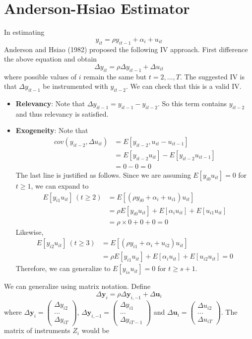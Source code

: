 \section{Anderson-Hsiao Estimator}
In estimating 
\[
y_{it}=\rho y_{it-1}+\alpha_i +u_{it}
\]
Anderson and Hsiao (1982) proposed the following IV approach. First difference the above equation and obtain
\[
\Delta y_{it}=\rho\Delta  y_{it-1} +\Delta u_{it}
\]
where possible values of $i$ remain the same but $t=2,...,T$. The suggested IV is that $\Delta y_{it-1}$ be instrumented with $y_{it-2}$. We can check that this is a valid IV. 
\begin{itemize}
\item \textbf{Relevancy}: Note that $\Delta y_{it-1}= y_{it-1}-y_{it-2}$. So this term contains $y_{it-2}$ and thus relevancy is satisfied.
\item \textbf{Exogeneity}: Note that
\begin{align*}
cov(y_{it-2},\Delta u_{it})&=E[y_{it-2}, u_{it}-u_{it-1}]\\
&=E[y_{it-2}u_{it}]-E[y_{it-2}u_{it-1}]\\
&=0-0=0
\end{align*}
The last line is justified as follows. Since we are assuming $E[y_{i0}u_{it}]=0$ for $t\geq1$, we can expand to
\begin{align*}
E[y_{i1}u_{it}]\ (t\geq 2)&=E[(\rho y_{i0}+\alpha_i +u_{i1})u_{it}]\\
&=\rho E[y_{i0}u_{it}]+E[\alpha_iu_{it}]+E[u_{i1}u_{it}]\\
&=\rho\times0+0+0=0
\end{align*}
Likewise, 
\begin{align*}
E[y_{i2}u_{it}]\ (t\geq 3)&=E[(\rho y_{i1}+\alpha_i +u_{i2})u_{it}]\\
&=\rho E[y_{i1}u_{it}]+E[\alpha_iu_{it}]+E[u_{i2}u_{it}]=0
\end{align*}
Therefore, we can generalize to $E[y_{is}u_{it}]=0$ for $t\geq s+1$. 
\end{itemize}
We can generalize using matrix notation. Define
\[
\Delta \mathbf{y}_i = \rho\Delta\mathbf{y}_{i,-1}+\Delta \mathbf{u}_i
\]
where $\Delta \mathbf{y}_i=\begin{pmatrix} \Delta y_{i2}\\ ...\\ \Delta y_{iT} \end{pmatrix}$, $\Delta \mathbf{y}_{i,-1}=\begin{pmatrix} \Delta y_{i1}\\ ...\\ \Delta y_{iT-1} \end{pmatrix}$ and $\Delta \mathbf{u}_i=\begin{pmatrix} \Delta u_{i2}\\ ...\\ \Delta u_{iT} \end{pmatrix}$. The matrix of instruments $Z_i$ would be
